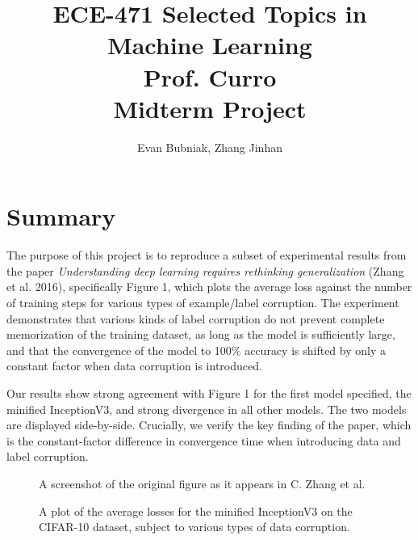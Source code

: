\documentclass[12pt]{article}
\title{%
	ECE-471 Selected Topics in Machine Learning \\
	Prof. Curro \\
	Midterm Project}
\author{Evan Bubniak, Zhang Jinhan}
\begin{document}
\maketitle

\section{Summary}

The purpose of this project is to reproduce a subset of experimental results from the paper \textit{Understanding deep learning requires rethinking generalization} (Zhang et al. 2016), specifically Figure 1, which plots the average loss against the number of training steps for various types of example/label corruption. The experiment demonstrates that various kinds of label corruption do not prevent complete memorization of the training dataset, as long as the model is sufficiently large, and that the convergence of the model to 100\% accuracy is shifted by only a constant factor when data corruption is introduced.

Our results show strong agreement with Figure 1 for the first model specified, the minified InceptionV3, and strong divergence in all other models. The two models are displayed side-by-side. Crucially, we verify the key finding of the paper, which is the constant-factor difference in convergence time when introducing data and label corruption.

\begin{figure}[H]
	\centering
	\begin{minipage}{.5\textwidth}
		\centering
		\caption{A screenshot of the original figure as it appears in C. Zhang et al.}
		\caption{A plot of the average losses for the minified InceptionV3 on the CIFAR-10 dataset, subject to various types of data corruption.}
	\end{minipage}
\end{figure}
\end{document}
